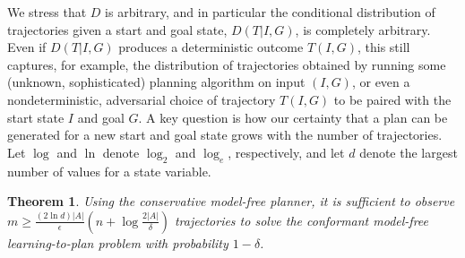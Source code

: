 \documentclass{article}
\newenvironment{proof}{\noindent{\bf Proof:~~}}{\qed}
\newcommand{\qed}{\hfill\ensuremath{\blacksquare}}
\newtheorem{theorem}{Theorem}
\newcommand{\MEMO}[1]
{ \fbox{
		\begin{minipage}[b]{7.9 cm}
			#1
		\end{minipage}
} }
\begin{document}
	We stress that $D$ is arbitrary, and in particular the conditional distribution
	of trajectories given a start and goal state, $D(T|I,G)$, is completely 
	arbitrary. Even if $D(T|I,G)$ produces a deterministic outcome $T(I,G)$, this
	still captures, for example, the distribution of trajectories obtained
	by running some (unknown, sophisticated) planning algorithm on input $(I,G)$, or
	even a nondeterministic, adversarial choice of trajectory $T(I,G)$ to 
	be paired with the start state $I$ and goal $G$. 
	A key question is how our certainty that a plan can be generated for a new start and goal state grows with the number of trajectories. Let $\log$ and $\ln$ denote $\log_2$ and $\log_e$, respectively, and let $d$ denote the largest number of values
	for a state variable. 
	\begin{theorem}
		Using the conservative model-free planner, 
		it is sufficient to observe 
		$m\geq\frac{(2\ln  d)|A|}{\epsilon}(n+\log\frac{2|A|}{\delta})$
		trajectories to solve the conformant model-free learning-to-plan problem with probability $1-\delta$. 
		\label{the:pac-conformant}
	\end{theorem}
\end{document}
